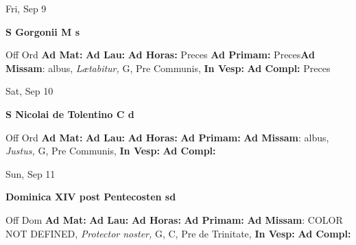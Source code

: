 \documentclass[10pt]{memoir}
\begin{document}
\begin{center}
\begin{minipage}{3.5in}
\vspace{2em}
\begin{center}Fri, Sep 9
\end{center}
\textbf{ \large S Gorgonii M
\textnormal{\normalsize s}}

\begin{justify}Off Ord
\textbf{Ad Mat: }
\textbf{Ad Lau: }
\textbf{Ad Horas: }Preces
\textbf{Ad Primam: }Preces\textbf{Ad Missam}: albus, \textit{Lætabitur,} G, Pre Communis, 
\textbf{In Vesp: }
\textbf{Ad Compl: }Preces
\end{justify}
\end{minipage}
\end{center}

\begin{center}
\begin{minipage}{3.5in}
\vspace{2em}
\begin{center}Sat, Sep 10
\end{center}
\textbf{ \large S Nicolai de Tolentino C
\textnormal{\normalsize d}}

\begin{justify}Off Ord
\textbf{Ad Mat: }
\textbf{Ad Lau: }
\textbf{Ad Horas: }
\textbf{Ad Primam: }\textbf{Ad Missam}: albus, \textit{Justus,} G, Pre Communis, 
\textbf{In Vesp: }
\textbf{Ad Compl: }
\end{justify}
\end{minipage}
\end{center}

\begin{center}
\begin{minipage}{3.5in}
\vspace{2em}
\begin{center}Sun, Sep 11
\end{center}
\textbf{ \large Dominica XIV post Pentecosten
\textnormal{\normalsize sd}}

\begin{justify}Off Dom
\textbf{Ad Mat: }
\textbf{Ad Lau: }
\textbf{Ad Horas: }
\textbf{Ad Primam: }\textbf{Ad Missam}: COLOR NOT DEFINED, \textit{Protector noster,} G, C, Pre de Trinitate, 
\textbf{In Vesp: }
\textbf{Ad Compl: }
\end{justify}
\end{minipage}
\end{center}
\end{document}
